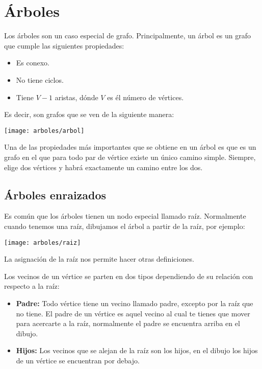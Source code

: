 \chapter{Árboles}

Los árboles son un caso especial de grafo. Principalmente, un árbol es un grafo que cumple las siguientes propiedades:

\begin{itemize}
	\item Es conexo.
	\item No tiene ciclos.
	\item Tiene \(V-1\) aristas, dónde \(V\) es él número de vértices.
\end{itemize}

Es decir, son grafos que se ven de la siguiente manera:

\begin{center}
	\texttt{[image: arboles/arbol]}
\end{center}

Una de las propiedades más importantes que se obtiene en un árbol es que es un grafo en el que para todo par de vértice existe un único camino simple. Siempre, elige dos vértices y habrá exactamente un camino entre los dos. 

\section{Árboles enraizados}
Es común que los árboles tienen un nodo especial llamado raíz. Normalmente cuando tenemos una raíz, dibujamos el árbol a partir de la raíz, por ejemplo:

\begin{center}
	\texttt{[image: arboles/raiz]}
\end{center}

La asignación de la raíz nos permite hacer otras definiciones. 


Los vecinos de un vértice se parten en dos tipos dependiendo de su relación con respecto a la raíz:
\begin{itemize}
	
\item \textbf{Padre:} Todo vértice tiene un vecino llamado padre, excepto por la raíz que no tiene. El padre de un vértice es aquel vecino al cual te tienes que mover para acercarte a la raíz, normalmente el padre se encuentra arriba en el dibujo.

\item \textbf{Hijos:} Los vecinos que se alejan de la raíz son los hijos, en el dibujo los hijos de un vértice se encuentran por debajo. 
\end{itemize}

